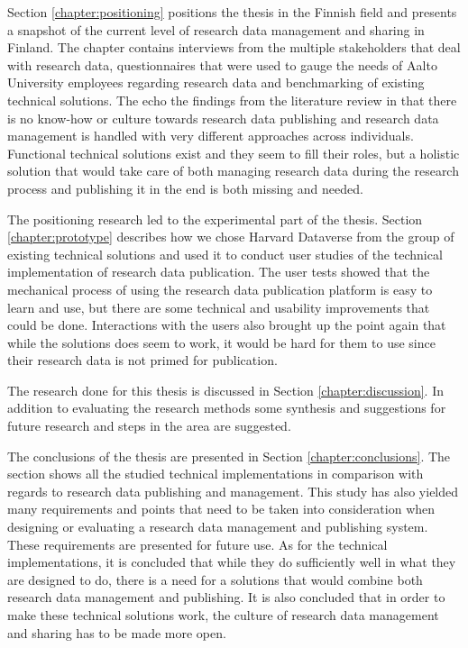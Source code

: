 Section \ref{chapter:positioning} positions the thesis in the Finnish field and
presents a snapshot of the current level of research data management and
sharing in Finland. The chapter contains interviews from the multiple
stakeholders that deal with research data, questionnaires that were used to
gauge the needs of Aalto University employees regarding research data and
benchmarking of existing technical solutions. The echo the findings from the
literature review in that there is no know-how or culture towards research
data publishing and research data management is handled with very different
approaches across individuals. Functional technical solutions exist and they
seem to fill their roles, but a holistic solution that would take care of both
managing research data during the research process and publishing it in the end
is both missing and needed.

The positioning research led to the experimental part of the thesis. Section
\ref{chapter:prototype} describes how we chose Harvard Dataverse from the
group of existing technical solutions and used it to conduct user studies of
the technical implementation of research data publication. The user tests
showed that the mechanical process of using the research data publication
platform is easy to learn and use, but there are some technical and usability
improvements that could be done. Interactions with the users also brought up
the point again that while the solutions does seem to work, it would be hard
for them to use since their research data is not primed for publication.

The research done for this thesis is discussed in Section
\ref{chapter:discussion}. In addition to evaluating the research methods
some synthesis and suggestions for future research and steps in the area
are suggested.

The conclusions of the thesis are presented in Section
\ref{chapter:conclusions}. The section shows all the studied technical
implementations in comparison with regards to research data publishing
and management. This study has also yielded many requirements and points
that need to be taken into consideration when designing or evaluating a
research data management and publishing system. These requirements are
presented for future use. As for the technical implementations, it is
concluded that while they do sufficiently well in what they are designed to
do, there is a need for a solutions that would combine both research data
management and publishing. It is also concluded that in order to make these
technical solutions work, the culture of research data management and sharing
has to be made more open.

